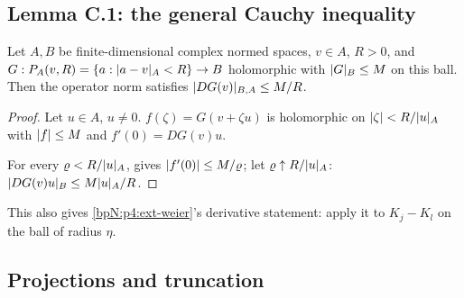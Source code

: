 \subsection{Lemma C.1: the general Cauchy inequality}\label{bpN:p4:s-c1}

\begin{lemma}[C.1]\label{bpN:p4:general-cauchy}
Let $A,B$ be finite-dimensional complex normed spaces, $v\in A$, $R>0$, and $G:P_A(v,R)=\{a:\lvert a-v\rvert_A<R\}\to B$ holomorphic with $\lvert G\rvert_B\le M$ on this ball. Then the operator norm satisfies $\lvert DG(v)\rvert_{B,A}\le M/R$.
\end{lemma}
\begin{proof}
\label{stepN:p4:c1-line} Let $u\in A$, $u\ne0$. $f(\zeta)=G(v+\zeta u)$ is holomorphic on $\lvert \zeta\rvert<R/\lvert u\rvert_A$ with $\lvert f\rvert\le M$ and $f'(0)=DG(v)u$.

\label{stepN:p4:c1-cauchy} For every $\varrho<R/\lvert u\rvert_A$,  gives $\lvert f'(0)\rvert\le M/\varrho$; let $\varrho\uparrow R/\lvert u\rvert_A$: $\lvert DG(v)u\rvert_B\le M\lvert u\rvert_A/R$.
\end{proof}
This also gives \ref{bpN:p4:ext-weier}'s derivative statement: apply it to $K_j-K_l$ on the ball of radius $\eta$.

\subsection{Projections and truncation}\label{bpN:p4:s-proj}

